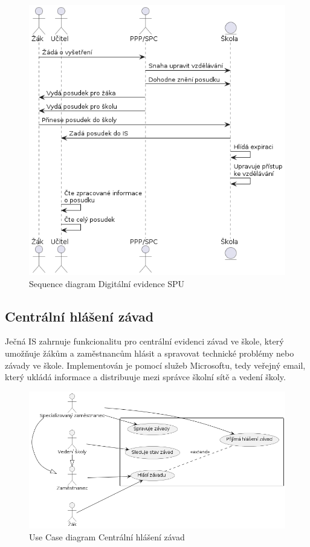 \documentclass[FM,Proj]{tulthesis}
\begin{document}
\begin{figure}[H]
    \includegraphics[width=\textwidth-28pt]{seq-digitalni-evidence-spu.png}
    \caption{Sequence diagram Digitální evidence SPU}
    \label{fig:seq-digitalni-evidence-spu}
\end{figure}

\subsection*{Centrální hlášení závad}
Ječná IS zahrnuje funkcionalitu pro centrální evidenci závad ve škole, který umožňuje
žákům a zaměstnancům hlásit a spravovat technické problémy nebo závady ve škole.
Implementován je pomocí služeb Microsoftu, tedy veřejný email, který ukládá informace
a distribuuje mezi správce školní sítě a vedení školy.

\begin{figure}[H]
    \includegraphics[width=\textwidth-28pt]{uc-centralni-hlaseni-zavad.png}
    \caption{Use Case diagram Centrální hlášení závad}
    \label{fig:uc-centralni-hlaseni-zavad}
\end{figure}
\end{document}
